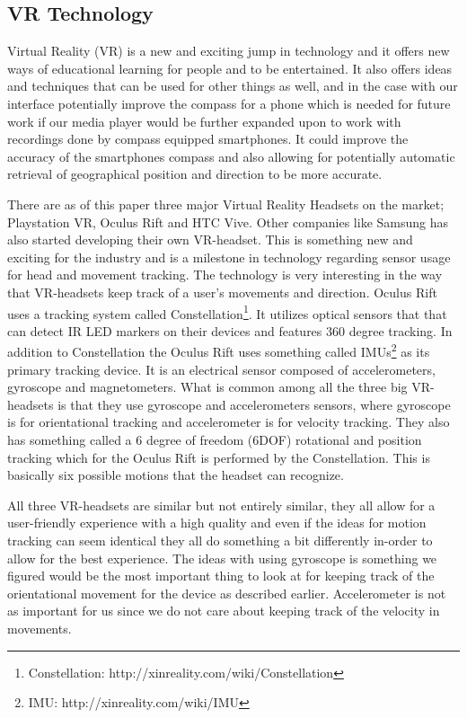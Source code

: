 \subsection{VR Technology}
\label{vrtechnology}
Virtual Reality (VR) is a new and exciting jump in technology and it offers new ways of educational learning for people and to be entertained. It also offers ideas and techniques that can be used for other things as well, and in the case with our interface potentially improve the compass for a phone which is needed for future work if our media player would be further expanded upon to work with recordings done by compass equipped smartphones. It could improve the accuracy of the smartphones compass and also allowing for potentially automatic retrieval of geographical position and direction to be more accurate. 

There are as of this paper three major Virtual Reality Headsets on the market; Playstation VR, Oculus Rift and HTC Vive. Other companies like Samsung has also started developing their own VR-headset. This is something new and exciting for the industry and is a milestone in technology regarding sensor usage for head and movement tracking. The technology is very interesting in the way that VR-headsets keep track of a user's movements and direction. Oculus Rift uses a tracking system called Constellation\footnote{Constellation: http://xinreality.com/wiki/Constellation}. It utilizes optical sensors that that can detect IR LED markers on their devices and features 360 degree tracking. In addition to Constellation the Oculus Rift uses something called IMUs\footnote{IMU: http://xinreality.com/wiki/IMU} as its primary tracking device. It is an electrical sensor composed of accelerometers, gyroscope and magnetometers. What is common among all the three big VR-headsets is that they use gyroscope and accelerometers sensors, where gyroscope is for orientational tracking and accelerometer is for velocity tracking. They also has something called a 6 degree of freedom (6DOF) rotational and position tracking which for the Oculus Rift is performed by the Constellation. This is basically six possible motions that the headset can recognize.

All three VR-headsets are similar but not entirely similar, they all allow for a user-friendly experience with a high quality and even if the ideas for motion tracking can seem identical they all do something a bit differently in-order to allow for the best experience. The ideas with using gyroscope is something we figured would be the most important thing to look at for keeping track of the orientational movement for the device as described earlier. Accelerometer is not as important for us since we do not care about keeping track of the velocity in movements.

